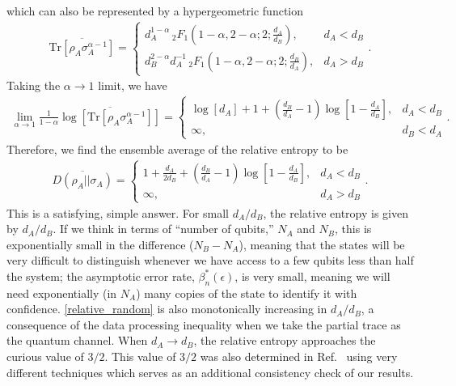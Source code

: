 \documentclass[a4paper,11pt]{article}
\newcommand{\Tr}{\text{Tr}}
\newcommand*{\SR}[1]{\textcolor{magenta}{[SR: \textsf{#1}]}}
\begin{document}
which can also be represented by a hypergeometric function
\begin{align}
    \overline{\Tr \left[\rho_{A}\sigma_A^{{\alpha}-1} \right]}=\begin{cases}
        d_A^{1-{\alpha}} \, _2F_1\left(1-{\alpha},2-{\alpha};2;\frac{d_A}{d_B}\right), &d_A < d_B
        \\
        d_B^{2-{\alpha}}d_A^{-1} \, _2F_1\left(1-{\alpha},2-{\alpha};2;\frac{d_B}{d_A}\right), &d_A > d_B
    \end{cases} .
\end{align}
Taking the $\alpha \rightarrow 1$ limit, we have
\begin{align}
    \lim_{\alpha \rightarrow 1}\frac{1}{1-\alpha} \overline{\log\left[\Tr \left[\rho_{A}\sigma_A^{{\alpha}-1} \right]\right]}= \begin{cases}
        \log \left[d_A\right] +1 +\left(\frac{d_B}{d_A}-1 \right)\log\left[1-\frac{d_A}{d_B} \right], & d_A < d_B
        \\
        \infty,& d_B < d_A
    \end{cases}.
\end{align}
Therefore, we find the ensemble average of
the relative entropy to be
\begin{align}
    \overline{D(\rho_A || \sigma_A)} = \begin{cases}
        1+\frac{d_A}{2 d_B}+\left(\frac{d_B}{d_A}-1\right) \log
   \left[1-\frac{d_A}{d_B}\right], & d_A < d_B
   \\
   \infty, & d_A > d_B
    \end{cases}.
    \label{relative_random}
\end{align}
This is a satisfying, simple answer. For small $d_A/d_B$, the relative entropy is given by $d_A/d_B$. If we think in terms of ``number of qubits,'' $N_A$ and $N_B$, this is exponentially small in the difference ($N_B-N_A$), meaning that the states will be very difficult to distinguish whenever we have access to a few qubits less than half the system; the asymptotic error rate, $\beta^*_n(\epsilon)$, is very small, meaning we will need exponentially (in $N_A$) many copies of the state to identify it with confidence. \eqref{relative_random} is also monotonically increasing in $d_A/d_B$, a consequence of the data processing inequality when we take the partial trace as the quantum channel. When $d_A \rightarrow d_B$, the relative entropy approaches the curious value of $3/2$. This value of $3/2$ was also determined in Ref.~\cite{2016PhRvA..93f2112P} using very different techniques which serves as an additional consistency check of our results.
\end{document}
